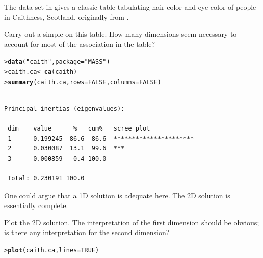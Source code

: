 \documentclass[10pt]{report}\usepackage[]{graphicx}\usepackage[]{color}
\makeatletter
\newcommand{\hlnum}[1]{\textcolor[rgb]{0.686,0.059,0.569}{#1}}%
\newcommand{\hlstr}[1]{\textcolor[rgb]{0.192,0.494,0.8}{#1}}%
\newcommand{\hlstd}[1]{\textcolor[rgb]{0.345,0.345,0.345}{#1}}%
\newcommand{\hlkwb}[1]{\textcolor[rgb]{0.69,0.353,0.396}{#1}}%
\newcommand{\hlkwc}[1]{\textcolor[rgb]{0.333,0.667,0.333}{#1}}%
\newcommand{\hlkwd}[1]{\textcolor[rgb]{0.737,0.353,0.396}{\textbf{#1}}}%
\newenvironment{kframe}{%
 \def\at@end@of@kframe{}%
 \ifinner\ifhmode%
  \def\at@end@of@kframe{\end{minipage}}%
  \begin{minipage}{\columnwidth}%
 \fi\fi%
 \def\FrameCommand##1{\hskip\@totalleftmargin \hskip-\fboxsep
 \colorbox{shadecolor}{##1}\hskip-\fboxsep
     \hskip-\linewidth \hskip-\@totalleftmargin \hskip\columnwidth}%
 \MakeFramed {\advance\hsize-\width
   \@totalleftmargin\z@ \linewidth\hsize
   \@setminipage}}%
 {\par\unskip\endMakeFramed%
 \at@end@of@kframe}
\newenvironment{knitrout}{}{} %
\renewenvironment{knitrout}{\small\renewcommand{\baselinestretch}{.85}}{} %
\makeatother
\begin{document}
\begin{Exercises}
\begin{enumerate*}
\begin{ans}
\begin{knitrout}
\end{knitrout}
    \end{ans}
    
  \end{enumerate*}
  
  \exercise The data set  in  gives a classic table 
  tabulating hair color and eye color 
  of people in Caithness, Scotland, originally from
  \citet{Fisher:1940}.
  \begin{enumerate*}
    \item Carry out a simple \ca on this table.  How many dimensions
    seem necessary to account for most of the association in the table?
    \begin{ans}
\begin{knitrout}\footnotesize
{}\color{fgcolor}\begin{kframe}
\begin{alltt}
\hlstd{> }\hlkwd{data}\hlstd{(}\hlstr{"caith"}\hlstd{,} \hlkwc{package}\hlstd{=}\hlstr{"MASS"}\hlstd{)}
\hlstd{> }\hlstd{caith.ca} \hlkwb{<-} \hlkwd{ca}\hlstd{(caith)}
\hlstd{> }\hlkwd{summary}\hlstd{(caith.ca,} \hlkwc{rows}\hlstd{=}\hlnum{FALSE}\hlstd{,} \hlkwc{columns}\hlstd{=}\hlnum{FALSE}\hlstd{)}
\end{alltt}
\begin{verbatim}

Principal inertias (eigenvalues):

 dim    value      %   cum%   scree plot               
 1      0.199245  86.6  86.6  **********************   
 2      0.030087  13.1  99.6  ***                      
 3      0.000859   0.4 100.0                           
        -------- -----                                 
 Total: 0.230191 100.0                                 
\end{verbatim}
\end{kframe}
\end{knitrout}
One could argue that a 1D solution is adequate here.  The 2D solution is essentially complete.

    \end{ans}
    
    \item Plot the 2D solution. The interpretation of the first dimension
    should be obvious; is there any interpretation for the second dimension?
    \begin{ans}
\begin{knitrout}\footnotesize
{}\color{fgcolor}\begin{kframe}
\begin{alltt}
\hlstd{> }\hlkwd{plot}\hlstd{(caith.ca,} \hlkwc{lines}\hlstd{=}\hlnum{TRUE}\hlstd{)}
\end{alltt}
\end{kframe}


\end{knitrout}
\end{ans}
\end{enumerate*}
\end{Exercises}
\end{document}
